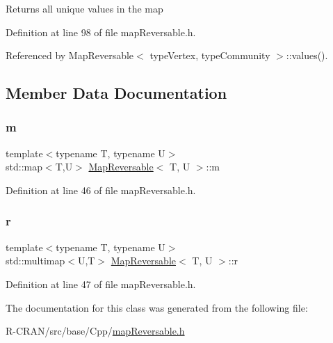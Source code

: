 \begin{DoxyReturn}{Returns}
all unique values in the map 
\end{DoxyReturn}


Definition at line 98 of file map\+Reversable.\+h.



Referenced by Map\+Reversable$<$ type\+Vertex, type\+Community $>$\+::values().



\subsection{Member Data Documentation}
\mbox{\label{classMapReversable_afdf022d06bd77580fe8c0c4309114f83}} 
\subsubsection{\texorpdfstring{m}{m}}
{\footnotesize\ttfamily template$<$typename T, typename U$>$ \\
std\+::map$<$T,U$>$ \hyperlink{classMapReversable}{Map\+Reversable}$<$ T, U $>$\+::m\hspace{0.3cm}{\ttfamily [private]}}



Definition at line 46 of file map\+Reversable.\+h.

\mbox{\label{classMapReversable_a301493c801719dbfef40db1cdc7a5ebe}} 
\subsubsection{\texorpdfstring{r}{r}}
{\footnotesize\ttfamily template$<$typename T, typename U$>$ \\
std\+::multimap$<$U,T$>$ \hyperlink{classMapReversable}{Map\+Reversable}$<$ T, U $>$\+::r\hspace{0.3cm}{\ttfamily [private]}}



Definition at line 47 of file map\+Reversable.\+h.



The documentation for this class was generated from the following file\+:\begin{DoxyCompactItemize}
\item 
R-\/\+C\+R\+A\+N/src/base/\+Cpp/\hyperlink{mapReversable_8h}{map\+Reversable.\+h}\end{DoxyCompactItemize}
